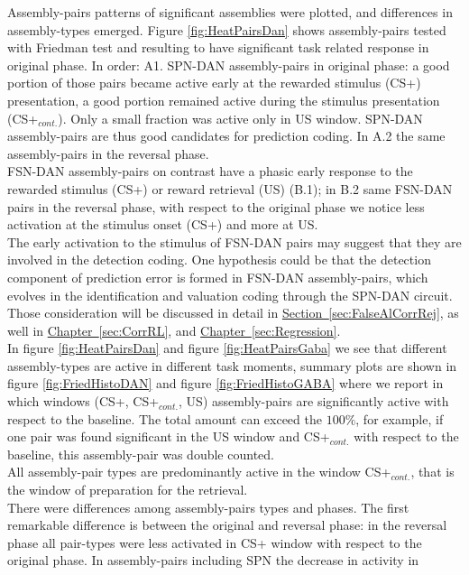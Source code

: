 Assembly-pairs patterns of significant assemblies were plotted, and differences in assembly-types emerged. Figure \ref{fig:HeatPairsDan} shows assembly-pairs tested with Friedman test and resulting to have significant task related response in original phase. In order: A1. SPN-DAN assembly-pairs in original phase: a good portion of those pairs became active early at the rewarded stimulus (CS+) presentation, a good portion remained active during the stimulus presentation (CS+$_{cont.}$). Only a small fraction was active only in US window. SPN-DAN assembly-pairs are thus good candidates for prediction coding. In A.2 the same assembly-pairs in the reversal phase.\\FSN-DAN assembly-pairs on contrast have a phasic early response to the rewarded stimulus (CS+) or reward retrieval (US) (B.1); in B.2 same FSN-DAN pairs in the reversal phase, with respect to the original phase we notice less activation at the stimulus onset (CS+) and more at US.\\The early activation to the stimulus of FSN-DAN pairs may suggest that they are involved in the detection coding. One hypothesis could be that the detection component of prediction error is formed in FSN-DAN assembly-pairs, which evolves in the identification and valuation coding through the SPN-DAN circuit. Those consideration will be discussed in detail in \hyperref[sec:FalseAlCorrRej]{Section~\ref*{sec:FalseAlCorrRej}}, as well in \hyperref[sec:CorrRL]{Chapter~\ref*{sec:CorrRL}}, and \hyperref[sec:Regression]{Chapter~\ref*{sec:Regression}}.\\In figure \ref{fig:HeatPairsDan} and figure \ref{fig:HeatPairsGaba} we see that different assembly-types are active in different task moments, summary plots are shown in figure  \ref{fig:FriedHistoDAN} and figure \ref{fig:FriedHistoGABA} where we report in which windows (CS+, CS+$_{cont.}$, US) assembly-pairs are significantly active with respect to the baseline. The total amount can exceed the $100\%$, for example, if one pair was found significant in the US window and CS+$_{cont.}$ with respect to the baseline, this assembly-pair was double counted.\\All assembly-pair types are predominantly active in the window CS+$_{cont.}$, that is the window of preparation for the retrieval.\\There were differences among assembly-pairs types and phases. The first remarkable difference is between the original and reversal phase: in the reversal phase all pair-types were less activated in CS+ window with respect to the original phase. In assembly-pairs including SPN the decrease in activity in 